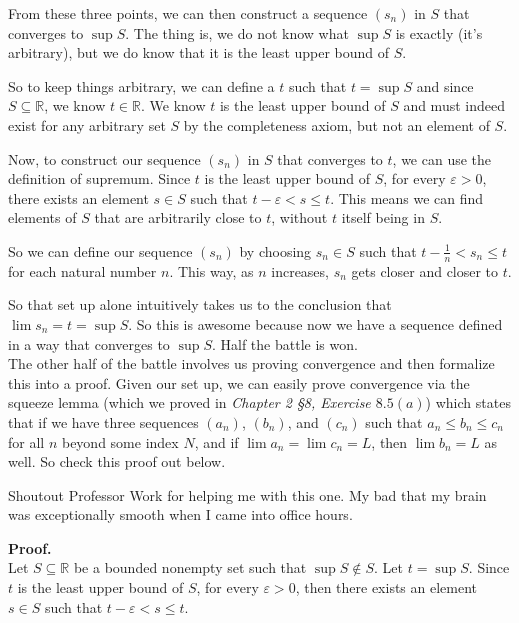 \documentclass[12pt]{article}
\begin{document}
From these three points, we can then construct a sequence $(s_n)$ in $S$ that converges to $\sup S$. The thing is, we do not know what $\sup S$ is exactly (it's arbitrary), but we do know that it is the least upper bound of $S$. 

So to keep things arbitrary, we can define a $t$ such that $t = \sup S$ and since $S \subseteq \mathbb{R}$, we know $t \in \mathbb{R}$. We know $t$ is the least upper bound of $S$ and must indeed exist for any arbitrary set $S$ by the completeness axiom, but not an element of $S$.

Now, to construct our sequence $(s_n)$ in $S$ that converges to $t$, we can use the definition of supremum. Since $t$ is the least upper bound of $S$, for every $\varepsilon > 0$, there exists an element $s \in S$ such that $t - \varepsilon < s \leq t$. This means we can find elements of $S$ that are arbitrarily close to $t$, without $t$ itself being in $S$.

So we can define our sequence $(s_n)$ by choosing $s_n \in S$ such that $t - \frac{1}{n} < s_n \leq t$ for each natural number $n$. This way, as $n$ increases, $s_n$ gets closer and closer to $t$.

So that set up alone intuitively takes us to the conclusion that $\lim s_n = t = \sup S$. So this is awesome because now we have a sequence defined in a way that converges to $\sup S$. Half the battle is won. \\

The other half of the battle involves us proving convergence and then formalize this into a proof. Given our set up, we can easily prove convergence via the squeeze lemma (which we proved in \textit{Chapter 2 \S8, Exercise $8.5 (a)$}) which states that if we have three sequences $(a_n)$, $(b_n)$, and $(c_n)$ such that $a_n \leq b_n \leq c_n$ for all $n$ beyond some index $N$, and if $\lim a_n = \lim c_n = L$, then $\lim b_n = L$ as well. So check this proof out below.

\small Shoutout Professor Work for helping me with this one. My bad that my brain was exceptionally smooth when I came into office hours. \normalsize
\vspace{0.25em}

\textbf{Proof.} \\ 
Let $S \subseteq \mathbb{R}$ be a bounded nonempty set such that $\sup S \notin S$. Let $t = \sup S$. Since $t$ is the least upper bound of $S$, for every $\varepsilon > 0$, then there exists an element $s \in S$ such that $t - \varepsilon < s \leq t$. \\
\end{document}
